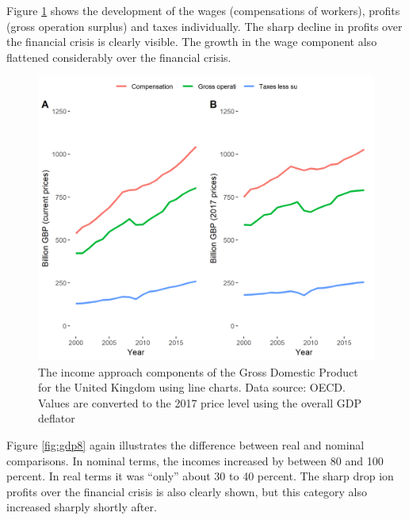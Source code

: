 \documentclass[]{book}
\begin{document}
Figure \ref{fig:gdp7} shows the development of the wages (compensations of workers), profits (gross operation surplus) and taxes individually. The sharp decline in profits over the financial crisis is clearly visible. The growth in the wage component also flattened considerably over the financial crisis.

\begin{figure}

{\centering \includegraphics[width=0.9\linewidth]{_resources/chapter_gdp/fig5} 

}

\caption{The income approach components of the Gross Domestic Product for the United Kingdom using line charts. Data source: OECD. Values are converted to the 2017 price level using the overall GDP deflator}\label{fig:gdp7}
\end{figure}

Figure \ref{fig:gdp8} again illustrates the difference between real and nominal comparisons. In nominal terms, the incomes increased by between 80 and 100 percent. In real terms it was ``only'' about 30 to 40 percent. The sharp drop ion profits over the financial crisis is also clearly shown, but this category also increased sharply shortly after.
\end{document}
